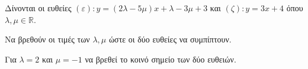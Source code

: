 Δίνονται οι ευθείες $ (\varepsilon) : y=(2\lambda-5\mu)x+\lambda-3\mu+3 $ και $ (\zeta) : y=3x+4 $ όπου $ \lambda,\mu\in\mathbb{R} $.
\begin{rlist}
\item Να βρεθούν οι τιμές των $ \lambda,\mu $ ώστε οι δύο ευθείες να συμπίπτουν.
\item Για $ \lambda=2 $ και $ \mu=-1 $ να βρεθεί το κοινό σημείο των δύο ευθειών.
\end{rlist}
